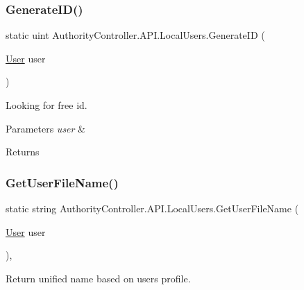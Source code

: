 \subsubsection{\texorpdfstring{Generate\+I\+D()}{GenerateID()}}
{\footnotesize\ttfamily static uint Authority\+Controller.\+A\+P\+I.\+Local\+Users.\+Generate\+ID (\begin{DoxyParamCaption}\item[{\mbox{\hyperlink{class_authority_controller_1_1_data_1_1_personal_1_1_user}{User}}}]{user }\end{DoxyParamCaption})\hspace{0.3cm}{\ttfamily [static]}}



Looking for free id. 


\begin{DoxyParams}{Parameters}
{\em user} & \\
\hline
\end{DoxyParams}
\begin{DoxyReturn}{Returns}

\end{DoxyReturn}
\mbox{\label{class_authority_controller_1_1_a_p_i_1_1_local_users_a67fe99b2249aacec99b18538ee86bec8}} 
\subsubsection{\texorpdfstring{Get\+User\+File\+Name()}{GetUserFileName()}}
{\footnotesize\ttfamily static string Authority\+Controller.\+A\+P\+I.\+Local\+Users.\+Get\+User\+File\+Name (\begin{DoxyParamCaption}\item[{\mbox{\hyperlink{class_authority_controller_1_1_data_1_1_personal_1_1_user}{User}}}]{user }\end{DoxyParamCaption})\hspace{0.3cm}{\ttfamily [static]}, {\ttfamily [private]}}



Return unified name based on user\textquotesingle{}s profile. 


